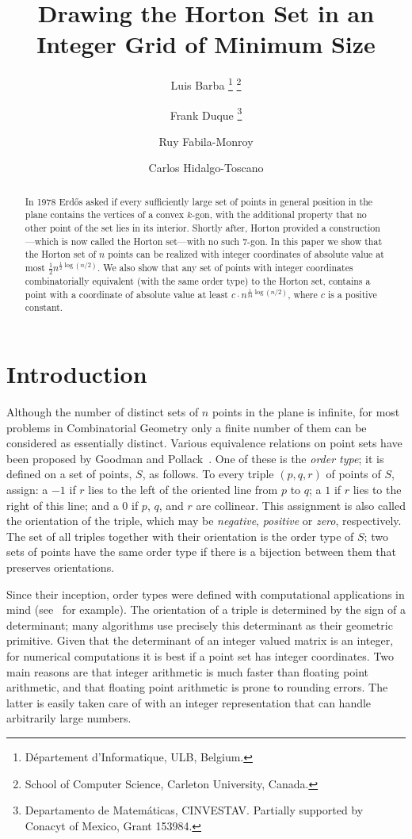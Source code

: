 \documentclass{article}
\title{Drawing the Horton Set in an Integer Grid of Minimum Size}
\author{Luis Barba \thanks{D\'epartement d'Informatique, ULB, Belgium.} \thanks{School of Computer Science, Carleton University, Canada.
} \and
  Frank Duque \thanks{Departamento de Matem\'aticas, CINVESTAV. Partially supported by Conacyt of
Mexico, Grant 153984.} \and
 Ruy Fabila-Monroy \footnotemark[3] \and
 Carlos Hidalgo-Toscano \footnotemark[3]}
\begin{document}
\maketitle


\begin{abstract}

In 1978 Erd\H os asked if every sufficiently large set of points in general
position in the plane contains the vertices of a convex $k$-gon, with the additional
property that no other point of the set lies in its interior. Shortly after, Horton provided a construction---which is now called
the Horton set---with no such $7$-gon. In this paper we show that the Horton set of $n$ points can be realized with 
integer coordinates of absolute value at most $\frac{1}{2} n^{\frac{1}{2} \log (n/2)}$.
We also show that any set of points with integer coordinates combinatorially equivalent (with the same order type)
to the Horton set,
 contains a point with  a coordinate of absolute value at least 
 $c \cdot n^{\frac{1}{24}\log (n/2)}$, where $c$ is a positive constant.

\end{abstract}

\section{Introduction}
Although the number of distinct sets of $n$ points in the plane is infinite,
for most problems in Combinatorial Geometry only a 
finite number of them can be considered as essentially distinct. 
Various equivalence relations on point sets have been proposed
by Goodman and Pollack~\cite{sec,semispaces,complexity,m_sorting}. 
One of these is the \emph{order type}; it is defined
on a set of points, $S$, as follows. To every triple $(p,q,r)$ of points of $S$, assign: a $-1$ if $r$
lies to the left of the oriented line from $p$ to $q$; a $1$ if $r$ lies
to the right of this line; and a $0$ if $p$, $q$, and $r$ are collinear.
This assignment is also called the orientation of the triple, which may
be \emph{negative}, \emph{positive} or \emph{zero}, respectively. The set of all
triples together with their orientation is the order type of $S$; 
two sets of points have the same
order type if there is a bijection between them that preserves orientations.

Since their inception, order types were defined with computational
applications in mind (see~\cite{m_sorting} for example). The orientation of a triple is
determined by the sign of a determinant; many algorithms
use precisely this determinant as their geometric primitive. 
Given that the determinant of an integer valued matrix is an integer,
for numerical computations it is best if a point set has
integer coordinates. Two main reasons are that integer arithmetic is much
faster than floating point arithmetic, and that floating point
arithmetic is prone to rounding errors. The latter is easily taken care of
 with an integer representation that can handle arbitrarily large numbers.
\end{document}
